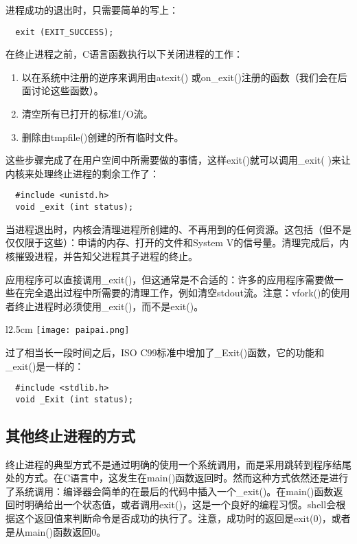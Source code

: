进程成功的退出时，只需要简单的写上：

\begin{lstlisting}
  exit (EXIT_SUCCESS);
\end{lstlisting}

在终止进程之前，C语言函数执行以下关闭进程的工作：

\begin{enumerate}
\item 以在系统中注册的逆序来调用由atexit() 或on\_exit()注册的函数（我们会在后面讨论这些函数）。
\item 清空所有已打开的标准I/O流。
\item 删除由tmpfile()创建的所有临时文件。
\end{enumerate}

这些步骤完成了在用户空间中所需要做的事情，这样exit()就可以调用\_exit( )来让内核来处理终止进程的剩余工作了：

\begin{lstlisting}
  #include <unistd.h>
  void _exit (int status);
\end{lstlisting}

当进程退出时，内核会清理进程所创建的、不再用到的任何资源。这包括（但不是仅仅限于这些）：申请的内存、打开的文件和System V的信号量。清理完成后，内核摧毁进程，并告知父进程其子进程的终止。

应用程序可以直接调用\_exit()，但这通常是不合适的：许多的应用程序需要做一些在完全退出过程中所需要的清理工作，例如清空stdout流。注意：vfork()的使用者终止进程时必须使用\_exit()，而不是exit()。

\begin{wrapfigure}{l}{2.5cm}
  \texttt{[image: paipai.png]}
\end{wrapfigure}
\mbox{}过了相当长一段时间之后，ISO C99标准中增加了\_Exit()函数，它的功能和\_exit()是一样的：

\begin{lstlisting}
  #include <stdlib.h>
  void _Exit (int status);
\end{lstlisting}

\subsection{其他终止进程的方式}

终止进程的典型方式不是通过明确的使用一个系统调用，而是采用跳转到程序结尾处的方式。在C语言中，这发生在main()函数返回时。然而这种方式依然还是进行了系统调用：编译器会简单的在最后的代码中插入一个\_exit()。在main()函数返回时明确给出一个状态值，或者调用exit()，这是一个良好的编程习惯。shell会根据这个返回值来判断命令是否成功的执行了。注意，成功时的返回是exit(0)，或者是从main()函数返回0。

